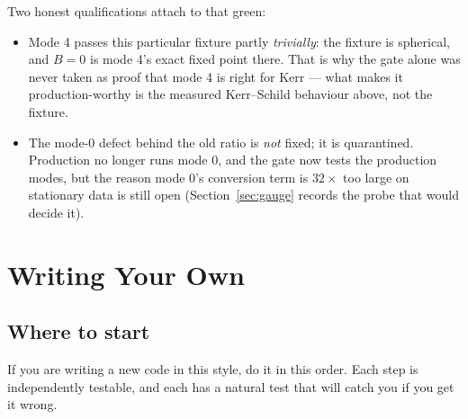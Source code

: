 \documentclass[11pt,openany]{book}
\begin{document}
Two honest qualifications attach to that green:
\begin{itemize}
\item Mode 4 passes this particular fixture partly \emph{trivially}: the
      fixture is spherical, and $B = 0$ is mode 4's exact fixed point there.
      That is why the gate alone was never taken as proof that mode 4 is
      right for Kerr --- what makes it production-worthy is the measured
      Kerr--Schild behaviour above, not the fixture.
\item The mode-0 defect behind the old ratio is \emph{not} fixed; it is
      quarantined. Production no longer runs mode 0, and the gate now tests
      the production modes, but the reason mode 0's conversion term is
      $32\times$ too large on stationary data is still open
      (Section~\ref{sec:gauge} records the probe that would decide it).
\end{itemize}


\chapter{Writing Your Own}
\label{ch:extend}

\section{Where to start}

If you are writing a new code in this style, do it in this order. Each step is
independently testable, and each has a natural test that will catch you if you
get it wrong.
\end{document}
